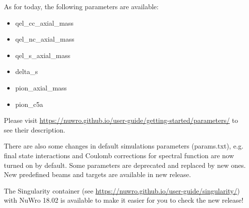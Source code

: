 \documentclass{article}
\begin{document}
\begin{minipage}{0.71\textwidth}
\vspace{10pt}

\setlength{\linewidth}{0.9\textwidth}
\setlength{\columnsep}{0.5cm}

\begin{multicols}{2}{

As for today, the following parameters are available:

\begin{itemize}
\setlength\itemsep{0.77em}
 \item {\sc qel\_cc\_axial\_mass}
 \item {\sc qel\_nc\_axial\_mass}
 \item {\sc qel\_s\_axial\_mass}
 \item {\sc delta\_s}
 \item {\sc pion\_axial\_mass}
 \item {\sc pion\_c5a}
\end{itemize}

Please visit \url{https://nuwro.github.io/user-guide/getting-started/parameters/} to see their description.


There are also some changes in default simulations parameters ({\sc params.txt}), e.g. final state interactions and Coulomb corrections for spectral function are now turned on by default. Some parameters are deprecated and replaced by new ones. New predefined beams and targets are available in new release.

The Singularity container (see \url{https://nuwro.github.io/user-guide/singularity/}) with NuWro 18.02 is available to make it easier for you to check the new release!

\closearticle

}\end{multicols}

\end{minipage}
\end{document}
